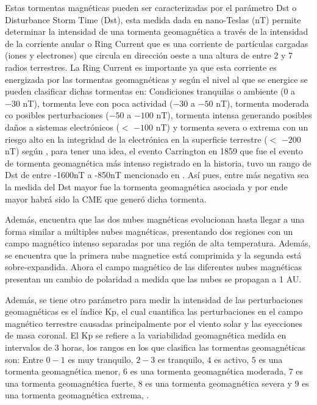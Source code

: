 Estas tormentas magnéticas pueden ser caracterizadas por el parámetro Dst o Disturbance Storm Time (Dst), esta medida dada en nano-Teslas (nT) permite determinar la intensidad de una tormenta geomagnética a través de la intensidad de la corriente anular o Ring Current que es una corriente de partículas cargadas (iones y electrones) que circula en dirección oeste a una altura de entre 2 y 7 radios terrestres. La Ring Current es importante ya que esta corriente es energizada por las tormentas geomagnéticas y según el nivel al que se energice se pueden clasificar dichas tormentas en: Condiciones tranquilas o ambiente (0 a $-30$ nT), tormenta leve con poca actividad ($-30$ a $-50$ nT), tormenta moderada co posibles perturbaciones ($-50$ a $-100$ nT), tormenta intensa generando posibles daños a sistemas electrónicos ($<$ $-100$ nT) y tormenta severa o extrema con un riesgo alto en la integridad de la electrónica en la superficie terrestre ($<$ $-200$ nT) según \cite{nhess-2018-92}, para tener una idea, el evento Carrington en 1859 que fue el evento de tormenta geomagnética más intenso registrado en la historia, tuvo un rango de Dst de entre -1600nT a -850nT mencionado en \cite[e.g.,][]{2014swcm.book.....H}. Así pues, entre más negativa sea la medida del Dst mayor fue la tormenta geomagnética asociada y por ende mayor habrá sido la \ac{CME} que generó dicha tormenta.

Además, \cite{lugaz-2005} encuentra que las dos nubes magnéticas evolucionan hasta llegar a una forma similar a múltiples nubes magnéticas, presentando dos regiones con un campo magnético intenso separadas por una región de alta temperatura. Además, se encuentra que la primera nube magnetice está comprimida y la segunda está sobre-expandida. Ahora el campo magnético de las diferentes nubes magnéticas presentan un cambio de polaridad a medida que las nubes se propagan a 1 AU.

Además, se tiene otro parámetro para medir la intensidad de las perturbaciones geomagnéticas es el índice Kp, el cual cuantifica las perturbaciones en el campo magnético terrestre causadas principalmente por el viento solar y las eyecciones de masa coronal. El Kp se refiere a la variabilidad geomagnética medida en intervalos de 3 horas, los rangos en los que clasifica las tormentas geomagnéticas son: Entre $0-1$ es muy tranquilo, $2-3$ es tranquilo, $4$ es activo, $5$ es una tormenta geomagnética menor, $6$ es una tormenta geomagnética moderada, $7$ es una tormenta geomagnética fuerte, $8$ es una tormenta geomagnética severa y $9$ es una tormenta geomagnética extrema, \cite{nhess-2018-92}.

